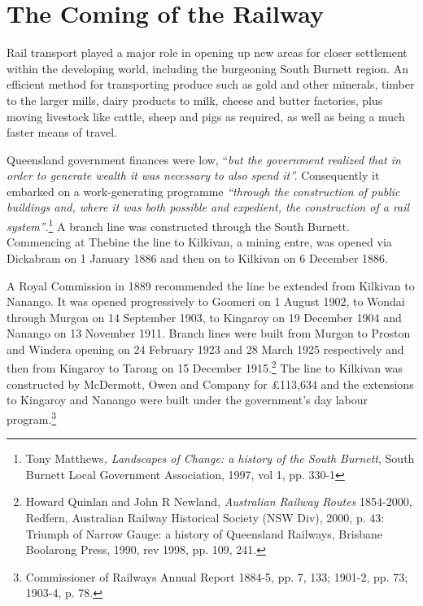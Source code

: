 \section{The Coming of the Railway}



\balance


Rail transport played a major role in opening up new areas for closer settlement within the developing world, including the burgeoning South Burnett region. An efficient method for transporting produce such as gold and other minerals, timber to the larger mills, dairy products to milk, cheese and butter factories, plus moving livestock like cattle, sheep and pigs as required, as well as being a much faster means of travel.



Queensland government finances were low, ``\emph{but the government realized that in order to generate wealth it was necessary to also spend it''.} Consequently it embarked on a work-generating programme \emph{``through the construction of public buildings and, where it was both possible and expedient, the construction of a rail system''}.\footnote{Tony Matthews\emph{, Landscapes of Change: a history of the South Burnett}, South Burnett Local Government Association, 1997, vol 1, pp. 330-1} A branch line was constructed through the South Burnett. Commencing at Thebine the line to Kilkivan, a mining entre, was opened via Dickabram on 1 January 1886 and then on to Kilkivan on 6 December 1886.


A Royal Commission in 1889 recommended the line be extended from Kilkivan to Nanango. It was opened progressively to Goomeri on 1 August 1902, to Wondai through Murgon on 14 September 1903, to Kingaroy on 19 December 1904 and Nanango on 13 November 1911. Branch lines were built from Murgon to Proston and Windera opening on 24 February 1923 and 28 March 1925 respectively and then from Kingaroy to Tarong on 15 December 1915.\footnote{Howard Quinlan and John R Newland, \emph{Australian Railway Routes} 1854-2000, Redfern, Australian Railway Historical Society (NSW Div), 2000, p. 43: Triumph of Narrow Gauge: a history of Queensland Railways, Brisbane Boolarong Press, 1990, rev 1998, pp. 109, 241.} The line to Kilkivan was constructed by McDermott, Owen and Company for \pounds113,634 and the extensions to Kingaroy and Nanango were built under the government's day labour program.\footnote{Commissioner of Railways Annual Report 1884-5, pp. 7, 133; 1901-2, pp. 73; 1903-4, p. 78.}


